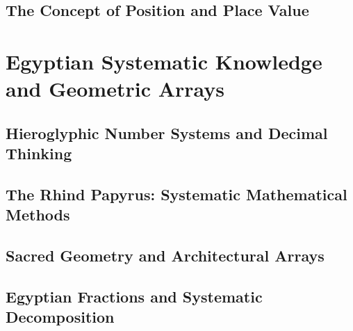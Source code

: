 \documentclass[12pt, oneside, openany]{book}
\let\oldchapter\chapter
\renewcommand{\chapter}{
	\cleardoublepage
	\thispagestyle{chapter}
	\oldchapter
}
\begin{document}
\section{The Concept of Position and Place Value}


\chapter{Egyptian Systematic Knowledge and Geometric Arrays}

\section{Hieroglyphic Number Systems and Decimal Thinking}

\section{The Rhind Papyrus: Systematic Mathematical Methods}

\section{Sacred Geometry and Architectural Arrays}

\section{Egyptian Fractions and Systematic Decomposition}

\end{document}
